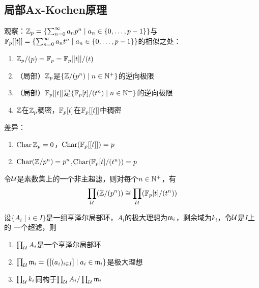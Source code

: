 \documentclass[11pt]{article}
\DeclareMathOperator{\Char}{Char}
\begin{document}
\subsection{局部Ax-Kochen原理}
\label{sec:org5586aea}
观察：\(\mathbb{Z}_p=\{\sum_{n=0}^\infty a_np^n\mid a_n\in\{0,\dots,p-1\}\}\)与
\(\mathbb{F}_p[[t]]=\{\sum_{n=0}^\infty a_nt^n\mid a_n\in\{0,\dots,p-1\}\}\)的相似之处：
\begin{enumerate}
\item \(\mathbb{Z}_p/(p)=\mathbb{F}_p=\mathbb{F}_p[[t]]/(t)\)
\item （局部）\(\mathbb{Z}_p\)是\(\{\mathbb{Z}/(p^n)\mid n\in\mathbb{N}^+\}\)的逆向极限
\item （局部）\(\mathbb{F}_p[[t]]\)是\(\{\mathbb{F}_p[t]/(t^n)\mid n\in\mathbb{N}^+\}\)的逆向极限
\item \(\mathbb{Z}\)在\(\mathbb{Z}_p\)稠密，\(\mathbb{F}_p[t]\)在\(\mathbb{F}_p[[t]]\)中稠密
\end{enumerate}
差异：
\begin{enumerate}
\item \(\Char\Z_p=0\)，\(\Char(\F_p[[t]])=p\)
\item \(\Char(\Z/p^n)=p^n\),\(\Char(\F_p[t]/(t^n))=p\)
\end{enumerate}


\begin{theorem}
令\(\mathcal{U}\)是素数集上的一个非主超滤，则对每个\(n\in\mathbb{N}^+\)，有
\begin{equation*}
\prod_{\mathcal{U}}(\mathbb{Z}/(p^n))\cong\prod_{\mathcal{U}}(\mathbb{F}_p[t]/(t^n))
\end{equation*}
\end{theorem}

\begin{lemma}[]
设\(\{A_i\mid i\in I\}\)是一组亨泽尔局部环，\(A_i\)的极大理想为\(\mathfrak{m}_i\)，剩余域为\(k_i\)，令\(\mathcal{U}\)是\(I\)上的
一个超滤，则
\begin{enumerate}
\item \(\prod_{\mathcal{U}}A_i\)是一个亨泽尔局部环
\item \(\prod_{\mathcal{U}}\mathfrak{m}_i=\{[(a_i)_{i\in I}]\mid a_i\in\mathfrak{m}_i\}\)是极大理想
\item \(\prod_{\mathcal{U}}k_i\)同构于\(\prod_{\mathcal{U}}A_i/\prod_{\mathcal{U}}\mathfrak{m}_i\)
\end{enumerate}
\end{lemma}
\end{document}
